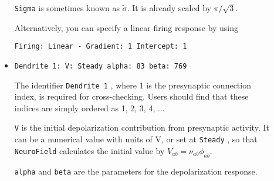 \documentclass[12pt,a4paper]{article}
\newcommand{\type}[1]{ {\small\small\tt #1} }
\newcommand{\NF}[0]{ \type{NeuroField}}
\begin{document}
\begin{description}
\begin{itemize}
	\type{Sigma} is sometimes known as \(\tilde{\sigma}\). It is already scaled by \(\pi/\sqrt{3}\).

	Alternatively, you can specify a linear firing response by using
	\begin{lstlisting}
Firing: Linear - Gradient: 1 Intercept: 1
	\end{lstlisting}

	\item
	\begin{lstlisting}
Dendrite 1: V: Steady alpha: 83 beta: 769
	\end{lstlisting}
	The identifier \type{Dendrite 1}, where 1 is the presynaptic connection index, is required for cross-checking. Users should find that these indices are simply ordered as 1, 2, 3, 4, ...
	
	\type{V} is the initial depolarization contribution from presynaptic activity. It can be a numerical value with units of V, or set at \type{Steady}, so that \NF calculates the initial value by \(V_{ab}=\nu_{ab}\phi_{ab}\).

	\type{alpha} and \type{beta} are the parameters for the depolarization response.
	\end{itemize}
\end{description}
\end{document}
